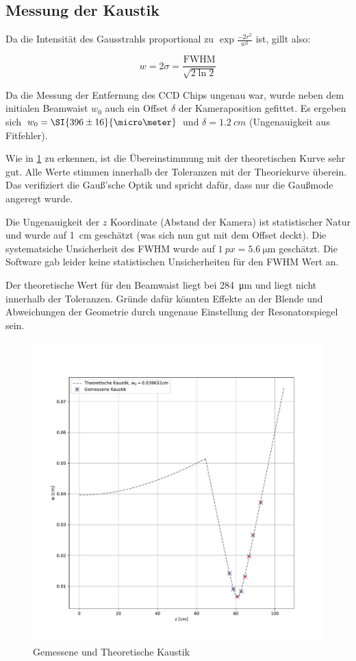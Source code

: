 \documentclass[slug=GL, room=HZDR\ Dresden/Rossendorf\,\ Geb.\ 620/123, supervisor=Tim\ Ziegler]{../../Lab_Report_LaTeX/lab_report}
\begin{document}
\subsection{Messung der Kaustik}
\label{sec:messkaustdisk}
Da die Intensit\"at des Gausstrahls proportional zu
\(\exp{\frac{-2r^2}{w^2}}\) ist, gillt also:

\begin{equation}
  \label{eq:beamwaistfwhm}
  w = 2\sigma = \frac{\text{FWHM}}{\sqrt{2\ln{2}}}
\end{equation}

Da die Messung der Entfernung des CCD Chips ungenau war, wurde neben
dem initialen Beamwaist \(w_0\) auch ein Offset \(\delta\) der Kameraposition
gefittet. Es ergeben sich \(w_0=\SI{396\pm 16}{\micro\meter}\) und
\(\delta=\SI{1.2}{cm}\) (Ungenauigkeit aus Fitfehler).

Wie in \ref{fig:kaustik} zu erkennen, ist die \"Ubereinstimmung mit
der theoretischen Kurve sehr gut. Alle Werte stimmen innerhalb der
Toleranzen mit der Theoriekurve \"uberein. Das verifiziert die
Gauß'sche Optik und spricht daf\"ur, dass nur die Gau\ss{}mode angeregt
wurde.

Die Ungenauigkeit der \(z\) Koordinate (Abstand der Kamera) ist
statistischer Natur und wurde auf \SI{1}{\centi\meter} gesch\"atzt
(was sich nun gut mit dem Offset deckt). Die systematsiche
Unsicherheit des FWHM wurde auf \(\SI{1}{px}=\SI{5.6}{\micro\meter}\)
gesch\"atzt. Die Software gab leider keine statistischen
Unsicherheiten f\"ur den FWHM Wert an.

Der theoretische Wert f\"ur den Beamwaist liegt bei
\SI{284}{\micro\meter} und liegt nicht innerhalb der Toleranzen. Gr\"unde
daf\"ur k\"onnten Effekte an der Blende und Abweichungen der Geometrie
durch ungenaue Einstellung der Resonatorspiegel sein.

\begin{figure}[b]\centering
  \includegraphics[width=.8\columnwidth]{figs/kaustik.pdf}
  \caption{Gemessene und Theoretische Kaustik}
  \label{fig:kaustik}
\end{figure}
\end{document}
